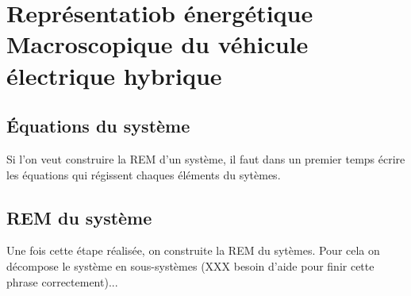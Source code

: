 \section{Représentatiob énergétique Macroscopique du véhicule électrique hybrique}

\subsection{Équations du système}

Si l'on veut construire la REM d'un système, il faut dans un premier temps écrire les équations qui régissent chaques éléments du sytèmes. 


\subsection{REM du système}
Une fois cette étape réalisée, on construite la REM du sytèmes. Pour cela on décompose le système en sous-systèmes (XXX besoin d'aide pour finir cette phrase correctement)...
